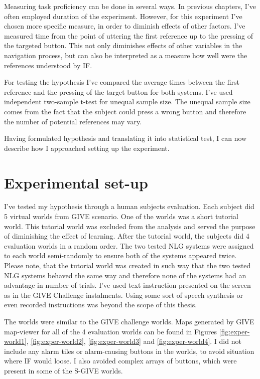 
Measuring task proficiency can be done in several ways. In previous chapters, I've often employed duration of the experiment. However, for this experiment I've chosen more specific measure, in order to diminish effects of other factors. I've measured time from the point of uttering the first reference up to the pressing of the targeted button. This not only diminishes effects of other variables in the navigation process, but can also be interpreted as a measure how well were the references understood by IF.

For testing the hypothesis I've compared the average times between the first reference and the pressing of the target button for both systems. I've used independent two-sample t-test for unequal sample size. The unequal sample size comes from the fact that the subject could press a wrong button and therefore the number of potential references may vary.

Having formulated hypothesis and translating it into statistical test, I can now describe how I approached setting up the experiment.

\section{Experimental set-up}
\label{sec:exper-setup}
I've tested my hypothesis through a human subjects evaluation. Each subject did 5 virtual worlds from GIVE scenario. One of the worlds was a short tutorial world. This tutorial world was excluded from the analysis and served the purpose of diminishing the effect of learning. After the tutorial world, the subjects did 4 evaluation worlds in a random order. The two tested NLG systems were assigned to each world semi-randomly to ensure both of the systems appeared twice. Please note, that the tutorial world was created in such way that the two tested NLG systems behaved the same way and therefore none of the systems had an advantage in number of trials. I've used text instruction presented on the screen as in the GIVE Challenge instalments. Using some sort of speech synthesis or even recorded instructions was beyond the scope of this thesis.

The worlds were similar to the GIVE challenge worlds. Maps generated by GIVE map-viewer for all of the 4 evaluation worlds can be found in Figures \ref{fig:exper-world1}, \ref{fig:exper-world2}, \ref{fig:exper-world3} and \ref{fig:exper-world4}. I did not include any alarm tiles or alarm-causing buttons in the worlds, to avoid situation where IF would loose. I also avoided complex arrays of buttons, which were present in some of the S-GIVE worlds.

